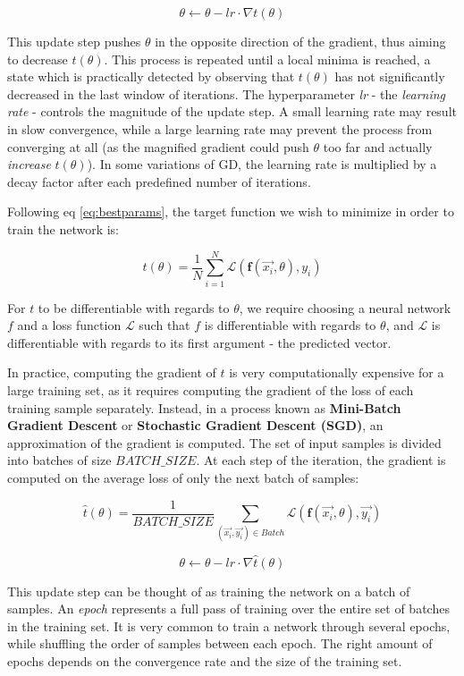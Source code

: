 $$ \theta \leftarrow \theta - \textit{lr} \cdot \nabla t(\theta) $$

This update step pushes $\theta$ in the opposite direction of the gradient, thus aiming to decrease $t(\theta)$. This process is repeated until a local minima is reached, a state which is practically detected by observing that $t(\theta)$ has not significantly decreased in the last window of iterations. The hyperparameter \textit{lr} - the \textit{learning rate} - controls the magnitude of the update step. A small learning rate may result in slow convergence, while a large learning rate may prevent the process from converging at all (as the magnified gradient could push $\theta$ too far and actually \emph{increase} $t(\theta)$). In some variations of GD, the learning rate is multiplied by a decay factor after each predefined number of iterations. 

Following eq \ref{eq:bestparams}, the target function we wish to minimize in order to train the network is:

$$ t(\theta) = \frac{1}{N}\sum_{i=1}^N \mathcal{L}(\textbf{f}(\vec{x_i}, \theta), y_i) $$

For $t$ to be differentiable with regards to $\theta$, we require choosing a neural network $f$ and a loss function $\mathcal{L}$ such that $f$ is differentiable with regards to $\theta$, and $\mathcal{L}$ is differentiable with regards to its first argument - the predicted vector.

In practice, computing the gradient of $t$ is very computationally expensive for a large training set, as it requires computing the gradient of the loss of each training sample separately. Instead, in a process known as \textbf{Mini-Batch Gradient Descent} or \textbf{Stochastic Gradient Descent (SGD)}, an approximation of the gradient is computed. The set of input samples is divided into batches of size $BATCH\_SIZE$. At each step of the iteration, the gradient is computed on the average loss of only the next batch of samples:

$$ \hat{t}(\theta) = \frac{1}{BATCH\_SIZE}\sum_{(\vec{x_i}, \vec{y_i}) \in Batch} \mathcal{L}(\textbf{f}(\vec{x_i}, \theta), \vec{y_i})  $$

$$ \theta \leftarrow \theta - \textit{lr} \cdot \nabla \hat{t}(\theta) $$

This update step can be thought of as training the network on a batch of samples. An \emph{epoch} represents a full pass of training over the entire set of batches in the training set. It is very common to train a network through several epochs, while shuffling the order of samples between each epoch. The right amount of epochs depends on the convergence rate and the size of the training set.


